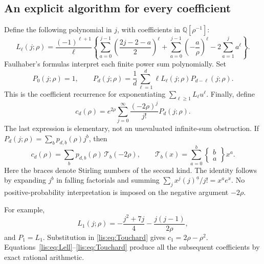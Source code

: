 \documentclass[11pt,letterpaper]{article}
\numberwithin{equation}{section}
\theoremstyle{definition}
\newcommand{\Q}{\mathbb Q}
\newcommand{\fall}[2]{(#1)^{\underline{#2}}}
\begin{document}
\subsection{An explicit algorithm for every coefficient}
Define the following polynomial in $j$, with coefficients in
$\Q[\rho^{-1}]$:
\begin{equation}
 L_\ell(j;\rho)=\frac{(-1)^{\ell+1}}{\ell}
 \left\{\sum_{a=0}^{j-1}\left(\frac{2j-2-a}{2}\right)^\ell
       +\sum_{a=0}^{j-1}\left(-\frac a\rho\right)^\ell
       -2\sum_{a=1}^{j}a^\ell\right\}.
 \label{lis:eq:Lell}
\end{equation}
Faulhaber's formulas interpret each finite power sum polynomially.
Set
\begin{equation}
 P_0(j;\rho)=1,\qquad
 P_d(j;\rho)=\frac1d\sum_{\ell=1}^{d}
                    \ell L_\ell(j;\rho)P_{d-\ell}(j;\rho).
 \label{lis:eq:Pell}
\end{equation}
This is the coefficient recurrence for exponentiating
$\sum_{\ell\ge1}L_\ell u^\ell$.
Finally, define
\begin{equation}
 c_d(\rho)=e^{2\rho}\sum_{j=0}^{\infty}
                  \frac{(-2\rho)^j}{j!}P_d(j;\rho).
 \label{lis:eq:cdsum}
\end{equation}
The last expression is elementary, not an unevaluated infinite-sum
obstruction. If $P_d(j;\rho)=\sum_b p_{d,b}(\rho)j^b$, then
\begin{equation}
 c_d(\rho)=\sum_b p_{d,b}(\rho)\,\mathcal T_b(-2\rho),
 \qquad
 \mathcal T_b(x)=\sum_{a=0}^{b}
       \left\{\begin{matrix}b\\a\end{matrix}\right\}x^a.
 \label{lis:eq:Touchard}
\end{equation}
Here the braces denote Stirling numbers of the second kind.
The identity follows by expanding $j^b$ in falling factorials and
summing $\sum_jx^j\fall{j}{a}/j!=x^ae^x$.
No positive-probability interpretation is imposed on the negative
argument $-2\rho$.

For example,
\begin{equation}
 L_1(j;\rho)=-\frac{j^2+7j}{4}
                     -\frac{j(j-1)}{2\rho},\label{lis:eq:L1}
\end{equation}
and $P_1=L_1$. Substitution in \eqref{lis:eq:Touchard} gives
$c_1=2\rho-\rho^2$. Equations~\eqref{lis:eq:Lell}--\eqref{lis:eq:Touchard}
produce all the subsequent coefficients by exact rational arithmetic.
\end{document}
